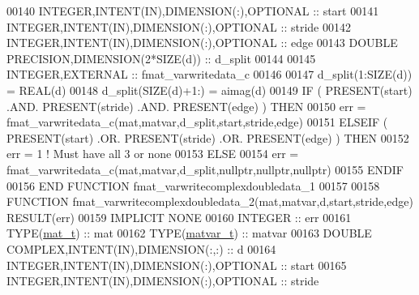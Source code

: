 \begin{DoxyCode}
00140     \textcolor{keywordtype}{INTEGER},\textcolor{keywordtype}{INTENT(IN)},\textcolor{keywordtype}{DIMENSION(:)},\textcolor{keywordtype}{OPTIONAL} :: start
00141     \textcolor{keywordtype}{INTEGER},\textcolor{keywordtype}{INTENT(IN)},\textcolor{keywordtype}{DIMENSION(:)},\textcolor{keywordtype}{OPTIONAL} :: stride
00142     \textcolor{keywordtype}{INTEGER},\textcolor{keywordtype}{INTENT(IN)},\textcolor{keywordtype}{DIMENSION(:)},\textcolor{keywordtype}{OPTIONAL} :: edge
00143     \textcolor{keywordtype}{DOUBLE PRECISION},\textcolor{keywordtype}{DIMENSION(2*SIZE(d))}    :: d\_split
00144 
00145     \textcolor{keywordtype}{INTEGER},\textcolor{keywordtype}{EXTERNAL}                         :: fmat\_varwritedata\_c
00146 
00147     d\_split(1:\textcolor{keyword}{SIZE}(d))  = \textcolor{keywordtype}{REAL}(d)
00148     d\_split(\textcolor{keyword}{SIZE}(d)+1:) = aimag(d)
00149     \textcolor{keywordflow}{IF} ( \textcolor{keyword}{PRESENT}(start) .AND. \textcolor{keyword}{PRESENT}(stride) .AND. \textcolor{keyword}{PRESENT}(edge) ) \textcolor{keywordflow}{THEN}
00150         err = fmat\_varwritedata\_c(mat,matvar,d\_split,start,stride,edge)
00151     \textcolor{keywordflow}{ELSEIF} ( \textcolor{keyword}{PRESENT}(start) .OR. \textcolor{keyword}{PRESENT}(stride) .OR. \textcolor{keyword}{PRESENT}(edge) ) \textcolor{keywordflow}{THEN}
00152         err = 1    \textcolor{comment}{! Must have all 3 or none}
00153     \textcolor{keywordflow}{ELSE}
00154         err = fmat\_varwritedata\_c(mat,matvar,d\_split,nullptr,nullptr,nullptr)
00155 \textcolor{keywordflow}{    ENDIF}
00156 \textcolor{keyword}{END FUNCTION }fmat\_varwritecomplexdoubledata\_1
00157 
00158 \textcolor{keyword}{FUNCTION }fmat\_varwritecomplexdoubledata\_2(mat,matvar,d,start,stride,edge) \textcolor{keyword}{RESULT}(err)
00159 \textcolor{keywordtype}{IMPLICIT NONE}
00160     \textcolor{keywordtype}{INTEGER}                                  :: err
00161     \textcolor{keywordtype}{TYPE}(\hyperlink{group___m_a_t_gab0fc888f5a5d79943b16284b1f91c2e8}{mat\_t})                              :: mat
00162     \textcolor{keywordtype}{TYPE}(\hyperlink{group___m_a_t_structmatvar__t}{matvar\_t})                           :: matvar
00163     \textcolor{keywordtype}{DOUBLE COMPLEX},\textcolor{keywordtype}{INTENT(IN)},\textcolor{keywordtype}{DIMENSION(:,:)} :: d
00164     \textcolor{keywordtype}{INTEGER},\textcolor{keywordtype}{INTENT(IN)},\textcolor{keywordtype}{DIMENSION(:)},\textcolor{keywordtype}{OPTIONAL} :: start
00165     \textcolor{keywordtype}{INTEGER},\textcolor{keywordtype}{INTENT(IN)},\textcolor{keywordtype}{DIMENSION(:)},\textcolor{keywordtype}{OPTIONAL} :: stride

\end{DoxyCode}

